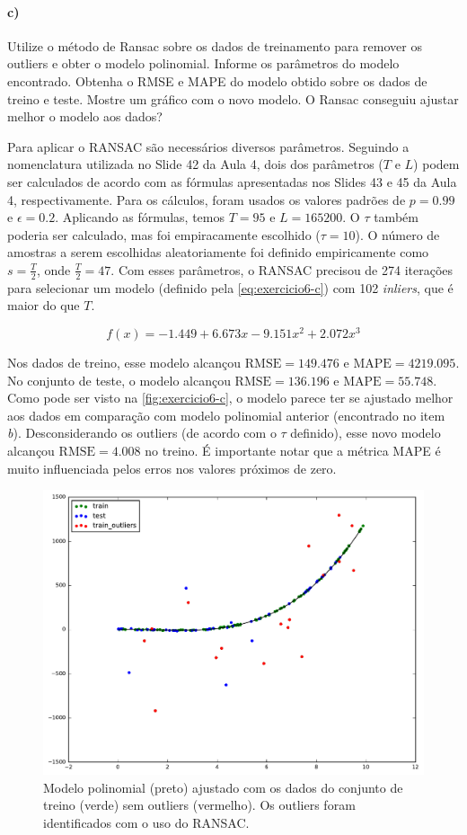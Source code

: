 \documentclass{article}
\begin{document}
\paragraph{c)} Utilize o método de Ransac sobre os dados de treinamento para remover os outliers e obter o modelo polinomial. Informe os parâmetros do modelo encontrado. Obtenha o RMSE e MAPE do modelo obtido sobre os dados de treino e teste. Mostre um gráfico com o novo modelo. O Ransac conseguiu ajustar melhor o modelo aos dados?

Para aplicar o RANSAC são necessários diversos parâmetros. Seguindo a nomenclatura utilizada no Slide 42 da Aula 4, dois dos parâmetros ($T$ e $L$) podem ser calculados de acordo com as fórmulas apresentadas nos Slides 43 e 45 da Aula 4, respectivamente. Para os cálculos, foram usados os valores padrões de $p=0.99$ e $\epsilon=0.2$. Aplicando as fórmulas, temos $T=95$ e $L = 165200$. O $\tau$ também poderia ser calculado, mas foi empiracamente escolhido ($\tau=10$). O número de amostras a serem escolhidas aleatoriamente foi definido empiricamente como $s = \frac{T}{2}$, onde $\frac{T}{2} = 47$. Com esses parâmetros, o RANSAC precisou de 274 iterações para selecionar um modelo (definido pela \autoref{eq:exercicio6-c}) com 102 \textit{inliers}, que é maior do que $T$.

\begin{equation}
\label{eq:exercicio6-c}
f(x) = -1.449 + 6.673x - 9.151x^2 + 2.072x^3
\end{equation}

Nos dados de treino, esse modelo alcançou $\mathrm{RMSE} = 149.476$ e $\mathrm{MAPE} = 4219.095$. No conjunto de teste, o modelo alcançou $\mathrm{RMSE} = 136.196$ e $\mathrm{MAPE} = 55.748$. Como pode ser visto na \autoref{fig:exercicio6-c}, o modelo parece ter se ajustado melhor aos dados em comparação com modelo polinomial anterior (encontrado no item \textit{b}). Desconsiderando os outliers (de acordo com o $\tau$ definido), esse novo modelo alcançou $\mathrm{RMSE} = 4.008$ no treino. É importante notar que a métrica MAPE é muito influenciada pelos erros nos valores próximos de zero.

\begin{figure}[h]
	\centering
	\includegraphics[width=0.5\linewidth]{exercicio6-c.pdf}
	\caption{Modelo polinomial (preto) ajustado com os dados do conjunto de treino (verde) sem outliers (vermelho). Os outliers foram identificados com o uso do RANSAC.}
	\label{fig:exercicio6-c}
\end{figure}
\end{document}
